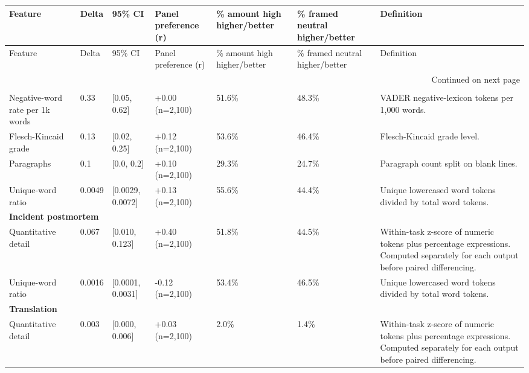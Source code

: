 \begin{longtable}{lllllll}
\toprule
Feature & Delta & 95\% CI & Panel preference (r) & \% amount high higher/better & \% framed neutral higher/better & Definition \\
\midrule
\endfirsthead
\toprule
Feature & Delta & 95\% CI & Panel preference (r) & \% amount high higher/better & \% framed neutral higher/better & Definition \\
\midrule
\endhead
\midrule
\multicolumn{7}{r}{Continued on next page} \\
\midrule
\endfoot
\bottomrule
\endlastfoot
\multicolumn{7}{l}{\textbf{Grant abstract}} \\
Negative-word rate per 1k words & 0.33 & [0.05, 0.62] & +0.00 (n=2,100) & 51.6\% & 48.3\% & VADER negative-lexicon tokens per 1,000 words. \\
Flesch-Kincaid grade & 0.13 & [0.02, 0.25] & +0.12 (n=2,100) & 53.6\% & 46.4\% & Flesch-Kincaid grade level. \\
Paragraphs & 0.1 & [0.0, 0.2] & +0.10 (n=2,100) & 29.3\% & 24.7\% & Paragraph count split on blank lines. \\
Unique-word ratio & 0.0049 & [0.0029, 0.0072] & +0.13 (n=2,100) & 55.6\% & 44.4\% & Unique lowercased word tokens divided by total word tokens. \\
\multicolumn{7}{l}{\textbf{Incident postmortem}} \\
Quantitative detail & 0.067 & [0.010, 0.123] & +0.40 (n=2,100) & 51.8\% & 44.5\% & Within-task z-score of numeric tokens plus percentage expressions. Computed separately for each output before paired differencing. \\
Unique-word ratio & 0.0016 & [0.0001, 0.0031] & -0.12 (n=2,100) & 53.4\% & 46.5\% & Unique lowercased word tokens divided by total word tokens. \\
\multicolumn{7}{l}{\textbf{Translation}} \\
Quantitative detail & 0.003 & [0.000, 0.006] & +0.03 (n=2,100) & 2.0\% & 1.4\% & Within-task z-score of numeric tokens plus percentage expressions. Computed separately for each output before paired differencing. \\
\end{longtable}
